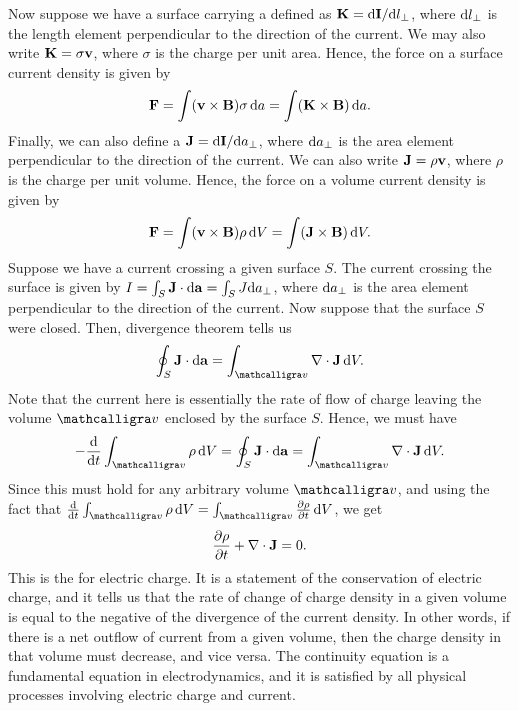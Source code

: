 Now suppose we have a surface carrying a  defined as $\mathbf{K} = \mathrm{d}\mathbf{I}/\mathrm{d}l_{\perp}$, where $\mathrm{d}l_{\perp}$ is the length element perpendicular to the direction of the current. We may also write $\mathbf{K} = \sigma \mathbf{v}$, where $\sigma$ is the charge per unit area. Hence, the force on a surface current density is given by
\begin{align}
    \mathbf{F} = \int (\mathbf{v} \times \mathbf{B}) \sigma \, \mathrm{d}a = \int (\mathbf{K} \times \mathbf{B})\, \mathrm{d}a.
\end{align}
Finally, we can also define a  $\mathbf{J} = \mathrm{d}\mathbf{I}/\mathrm{d}a_{\perp}$, where $\mathrm{d}a_{\perp}$ is the area element perpendicular to the direction of the current. We can also write $\mathbf{J} = \rho \mathbf{v}$, where $\rho$ is the charge per unit volume. Hence, the force on a volume current density is given by
\begin{align}
    \mathbf{F} = \int (\mathbf{v} \times \mathbf{B}) \rho \, \mathrm{d}V = \int (\mathbf{J} \times \mathbf{B})\, \mathrm{d}V.
\end{align}
Suppose we have a current crossing a given surface $S$. The current crossing the surface is given by $I = \int_{S} \mathbf{J} \cdot \mathrm{d}\mathbf{a} = \int_{S} J \mathrm{d}a_{\perp}$, where $\mathrm{d}a_{\perp}$ is the area element perpendicular to the direction of the current. Now suppose that the surface $S$ were closed. Then, divergence theorem tells us
\begin{align}
    \oint_{S} \bv{J} \cdot \di{\bv{a}} = \int_{\curs{v}} \nabla \cdot \bv{J} \, \di{V}.
\end{align}
Note that the current here is essentially the rate of flow of charge leaving the volume $\curs{v}$ enclosed by the surface $S$. Hence, we must have
\begin{align}
    -\frac{\di{}}{\di{t}} \int_{\curs{v}} \rho \, \di{V} = \oint_{S} \bv{J} \cdot \di{\bv{a}} = \int_{\curs{v}} \nabla \cdot \bv{J} \, \di{V}.
\end{align}
Since this must hold for any arbitrary volume $\curs{v}$, and using the fact that $\frac{\di{}}{\di{t}} \int_{\curs{v}} \rho \, \di{V} = \int_{\curs{v}} \frac{\partial{\rho}}{\partial{t}} \, \di{V}$, we get
\begin{align}
    \frac{\partial{\rho}}{\partial{t}} + \nabla \cdot \mathbf{J} = 0.
\end{align}
This is the  for electric charge. It is a statement of the conservation of electric charge, and it tells us that the rate of change of charge density in a given volume is equal to the negative of the divergence of the current density. In other words, if there is a net outflow of current from a given volume, then the charge density in that volume must decrease, and vice versa. The continuity equation is a fundamental equation in electrodynamics, and it is satisfied by all physical processes involving electric charge and current.


